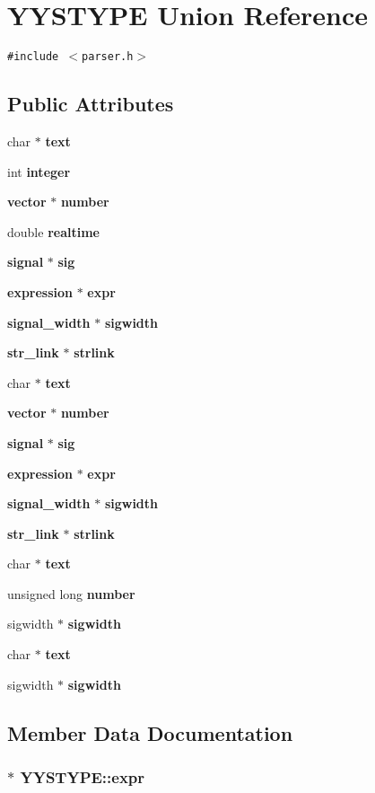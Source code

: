 \section{YYSTYPE  Union Reference}
\label{unionYYSTYPE}
{\tt \#include $<$parser.h$>$}

\subsection*{Public Attributes}
\begin{CompactItemize}
\item 
char $\ast$ {\bf text}
\item 
int {\bf integer}
\item 
{\bf vector} $\ast$ {\bf number}
\item 
double {\bf realtime}
\item 
{\bf signal} $\ast$ {\bf sig}
\item 
{\bf expression} $\ast$ {\bf expr}
\item 
{\bf signal\_\-width} $\ast$ {\bf sigwidth}
\item 
{\bf str\_\-link} $\ast$ {\bf strlink}
\item 
char $\ast$ {\bf text}
\item 
{\bf vector} $\ast$ {\bf number}
\item 
{\bf signal} $\ast$ {\bf sig}
\item 
{\bf expression} $\ast$ {\bf expr}
\item 
{\bf signal\_\-width} $\ast$ {\bf sigwidth}
\item 
{\bf str\_\-link} $\ast$ {\bf strlink}
\item 
char $\ast$ {\bf text}
\item 
unsigned long {\bf number}
\item 
sigwidth $\ast$ {\bf sigwidth}
\item 
char $\ast$ {\bf text}
\item 
sigwidth $\ast$ {\bf sigwidth}
\end{CompactItemize}


\subsection{Member Data Documentation}
\subsubsection{$\ast$ YYSTYPE::expr}\label{unionYYSTYPE_m11}


